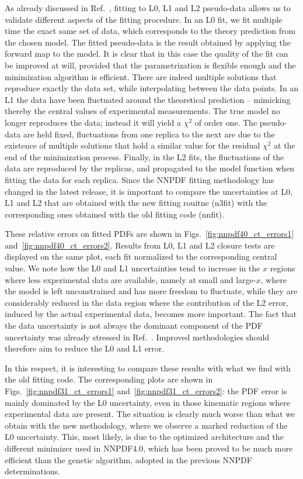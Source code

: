 As already discussed in Ref.~\cite{nnpdf30}, fitting to L0, L1 and L2
pseudo-data allows us to validate different aspects of the fitting procedure. In
an L0 fit, we fit multiple time the exact same set of data, which corresponds to
the theory prediction from the chosen model. The fitted pseudo-data is the
result obtained by applying the forward map to the model. It is clear that in
this case the quality of the fit can be improved at will, provided that the
parametrization is flexible enough and the minimization algorithm is efficient.
There are indeed multiple solutions that reproduce exactly the data set, while
interpolating between the data points. In an L1 the data have been fluctuated
around the theoretical prediction -- mimicking thereby the central values of
experimental measurements. The true model no longer reproduces the data; instead
it will yield a $\chi^2$ of order one. The pseudo-data are held fixed,
fluctuations from one replica to the next are due to the existence of multiple
solutions that hold a similar value for the residual $\chi^2$ at the end of the
minimization process. Finally, in the L2 fits, the fluctuations of the data are
reproduced by the replicas, and propagated to the model function when fitting
the data for each replica. Since the NNPDF fitting methodology has changed in
the latest release, it is important to compare the uncertainties at L0, L1 and
L2 that are obtained with the new fitting rouitne (n3fit) with the corresponding
ones obtained with the old fitting code (nnfit). 

These relative errors on fitted PDFs are shown in Figs.~\ref{fig:nnpdf40_ct_errors1} and~\ref{fig:nnpdf40_ct_errors2}.
Results from L0, L1 and L2 closure tests are displayed on the same plot, each fit
normalized to the corresponding central value. 
We note how the L0 and L1 uncertainties tend to increase in the $x$ regions where less experimental data are available,
namely at small and large-$x$, where the model is left unconstrained and has more freedom to fluctuate,
while they are considerably reduced in the data region 
where the contribution of the L2 error, induced by the actual experimental data, becomes more important.
The fact that the data uncertainty is not always the dominant component of the PDF uncertainty
was already stressed in Ref.~\cite{nnpdf30}. Improved methodologies should therefore aim to reduce the L0 and L1
error. 

In this respect, it is interesting to compare these results with what we find with the old fitting code. The corresponding
plots are shown in Figs.~\ref{fig:nnpdf31_ct_errors1} and~\ref{fig:nnpdf31_ct_errors2}: the PDF error 
is mainly dominated by the L0 uncertainty, even in those kinematic regions where experimental data are present.
The situation is clearly much worse than what we obtain with the new methodology, where we observe a marked  
reduction of the L0 uncertainty.
This, most likely, is due to the optimized architecture and the different minimizer used in NNPDF4.0, 
which has been proved to be much more efficient than the genetic algorithm, adopted in the previous NNPDF determinations.

